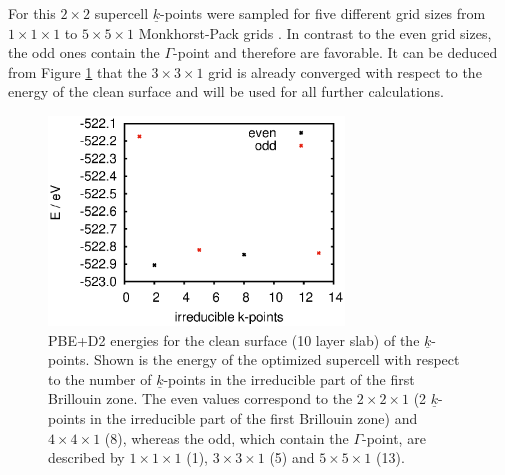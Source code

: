 \documentclass[11pt,DIV=13,BCOR=5mm,a4paper,headinclude]{scrbook}
\renewcommand{\vec}[1]{\underline{#1}}
\begin{document}
For this $2\times 2$ supercell $\vec{k}$-points were sampled for five different grid sizes from $1\times 1\times 1$ to $5\times 5\times 1$ Monkhorst-Pack grids \cite{monkhorst}.
In contrast to the even grid sizes, the odd ones contain the $\Gamma$-point and therefore are favorable.
It can be deduced from Figure \ref{abb:11-20-kpointsampling} that the $3\times 3\times 1$ grid is already converged with respect to the energy of the clean surface and will be used for all further calculations.
\begin{figure}[!h]
\centering
 \includegraphics[width=0.7\textwidth]{figures/11-20/irreducibles-E.eps}
   \caption{PBE+D2 energies for the clean surface (10 layer slab) of the $\vec{k}$-points. Shown is the energy of the optimized supercell with respect to the number of $\vec{k}$-points in the irreducible part of the first Brillouin zone.
The even values correspond to the $2\times 2 \times 1$ (2 $\vec{k}$-points in the irreducible part of the first Brillouin zone) and $4\times 4\times 1$ (8), whereas the odd, which contain the $\Gamma$-point, are described by $1\times 1\times 1$ (1), $3\times 3\times 1$ (5) and $5\times 5\times 1$ (13).}
            \label{abb:11-20-kpointsampling}
\end{figure}
\end{document}
